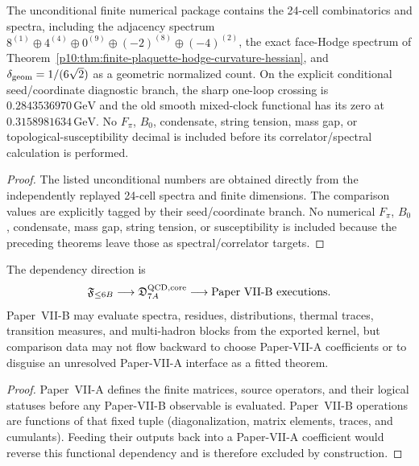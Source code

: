 \documentclass[12pt,a4paper]{article}
\providecommand{\deltageom}{\delta_{\rm geom}}
\begin{document}
\begin{corollary}
\label{p10:cor:numerical-finite-qcd-export-package}
The unconditional finite numerical package contains the 24-cell combinatorics and spectra, including the adjacency spectrum
\(8^{(1)}\oplus4^{(4)}\oplus0^{(9)}\oplus(-2)^{(8)}\oplus(-4)^{(2)}\),
the exact face-Hodge spectrum of Theorem~\ref{p10:thm:finite-plaquette-hodge-curvature-hessian}, and \(\deltageom=1/(6\sqrt2)\) as a geometric normalized count.  On the explicit conditional seed/coordinate diagnostic branch, the sharp one-loop crossing is \(0.2843536970\,\mathrm{GeV}\) and the old smooth mixed-clock functional has its zero at \(0.3158981634\,\mathrm{GeV}\).  No \(F_\pi\), \(B_0\), condensate, string tension, mass gap, or topological-susceptibility decimal is included before its correlator/spectral calculation is performed.
\end{corollary}
\begin{proof}
The listed unconditional numbers are obtained directly from the independently replayed 24-cell spectra and finite dimensions.  The comparison values are explicitly tagged by their seed/coordinate branch.  No numerical $F_\pi$, $B_0$, condensate, mass gap, string tension, or susceptibility is included because the preceding theorems leave those as spectral/correlator targets.
\end{proof}

\begin{theorem}
\label{p10:thm:paper-x-xi-boundary}
The dependency direction is
\[
\mathfrak F_{\le6B}\longrightarrow\mathfrak D_{7A}^{\rm QCD,core}
\longrightarrow\text{Paper~VII-B executions}.
\]
Paper~VII-B may evaluate spectra, residues, distributions, thermal traces, transition measures, and multi-hadron blocks from the exported kernel, but comparison data may not flow backward to choose Paper-VII-A coefficients or to disguise an unresolved Paper-VII-A interface as a fitted theorem.
\end{theorem}
\begin{proof}
Paper~VII-A defines the finite matrices, source operators, and their logical statuses before any Paper-VII-B observable is evaluated.  Paper~VII-B operations are functions of that fixed tuple (diagonalization, matrix elements, traces, and cumulants).  Feeding their outputs back into a Paper-VII-A coefficient would reverse this functional dependency and is therefore excluded by construction.
\end{proof}
\end{document}
